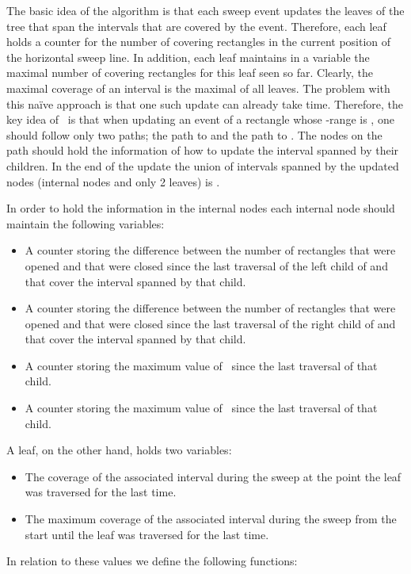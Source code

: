 {{The basic idea of the algorithm is that
each sweep event updates the leaves of the tree 
that span the intervals that are covered by the event.
Therefore, each leaf holds a counter  for the
number of covering rectangles in the current position
of the horizontal sweep line.
In addition, each leaf maintains in
a variable  the maximal number of
covering rectangles for this leaf seen so far.
Clearly, the maximal coverage of an interval
is the maximal  of all leaves.
The problem with this na\"{i}ve approach
is that one such update can already
take  time.
Therefore, the key idea of~\cite{as-cdaaa-13}
is that when updating an event of a rectangle
whose -range is ,
one should follow only two paths;
the path to  and the path to .
The nodes on the path should hold the
information of how to update the
interval spanned by their children.
In the end of the update the union of
intervals spanned by the updated nodes
(internal nodes and only 2 leaves) is .

In order to hold the information in the internal nodes
each internal node should maintain the following variables:
\begin{itemize}
\item[]
A counter storing the difference between the number of
rectangles that were opened and that were closed
since the last traversal of the left child of 
and that cover the interval spanned by that child.
\item[]
A counter storing the difference between the number of
rectangles that were opened and that were closed
since the last traversal of the right child of 
and that cover the interval spanned by that child.
\item[]
A counter storing the maximum value of~
since the last traversal of that child.
\item[]
A counter storing the maximum value of~
since the last traversal of that child.
\end{itemize}

\noindent
A leaf, on the other hand, holds two variables:
\begin{itemize}
\item[]
The coverage of the associated interval during the sweep
at the point the leaf was traversed for the last time. \item[]
The maximum coverage of the associated
interval during the sweep from the start until the leaf was traversed for the last time. \end{itemize}

\noindent
In relation to these values we define the following functions:




}}
